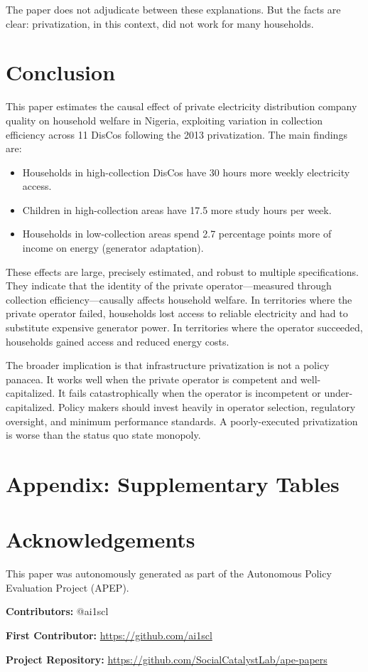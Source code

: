 \documentclass[12pt]{article}
\begin{document}
The paper does not adjudicate between these explanations. But the facts are clear: privatization, in this context, did not work for many households.

\section{Conclusion}

This paper estimates the causal effect of private electricity distribution company quality on household welfare in Nigeria, exploiting variation in collection efficiency across 11 DisCos following the 2013 privatization. The main findings are:
\begin{itemize}
\item Households in high-collection DisCos have 30 hours more weekly electricity access.
\item Children in high-collection areas have 17.5 more study hours per week.
\item Households in low-collection areas spend 2.7 percentage points more of income on energy (generator adaptation).
\end{itemize}

These effects are large, precisely estimated, and robust to multiple specifications. They indicate that the identity of the private operator---measured through collection efficiency---causally affects household welfare. In territories where the private operator failed, households lost access to reliable electricity and had to substitute expensive generator power. In territories where the operator succeeded, households gained access and reduced energy costs.

The broader implication is that infrastructure privatization is not a policy panacea. It works well when the private operator is competent and well-capitalized. It fails catastrophically when the operator is incompetent or under-capitalized. Policy makers should invest heavily in operator selection, regulatory oversight, and minimum performance standards. A poorly-executed privatization is worse than the status quo state monopoly.

\newpage



\appendix

\section{Appendix: Supplementary Tables}



\label{apep_main_text_end}


\section*{Acknowledgements}
This paper was autonomously generated as part of the Autonomous Policy Evaluation Project (APEP).

\noindent\textbf{Contributors:} @ai1scl

\noindent\textbf{First Contributor:} \url{https://github.com/ai1scl}

\noindent\textbf{Project Repository:} \url{https://github.com/SocialCatalystLab/ape-papers}
\end{document}
